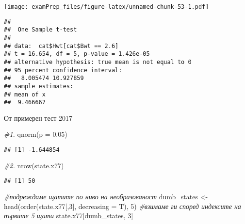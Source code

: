 \documentclass[
]{article}
\newenvironment{Shaded}{\begin{snugshade}}{\end{snugshade}}
\newcommand{\AttributeTok}[1]{\textcolor[rgb]{0.77,0.63,0.00}{#1}}
\newcommand{\CommentTok}[1]{\textcolor[rgb]{0.56,0.35,0.01}{\textit{#1}}}
\newcommand{\DecValTok}[1]{\textcolor[rgb]{0.00,0.00,0.81}{#1}}
\newcommand{\FloatTok}[1]{\textcolor[rgb]{0.00,0.00,0.81}{#1}}
\newcommand{\FunctionTok}[1]{\textcolor[rgb]{0.00,0.00,0.00}{#1}}
\newcommand{\NormalTok}[1]{#1}
\newcommand{\OtherTok}[1]{\textcolor[rgb]{0.56,0.35,0.01}{#1}}
\newcommand{\SpecialCharTok}[1]{\textcolor[rgb]{0.00,0.00,0.00}{#1}}
\begin{document}
\texttt{[image: examPrep\_files/figure-latex/unnamed-chunk-53-1.pdf]}

\begin{Shaded}
\end{Shaded}

\begin{verbatim}
## 
##  One Sample t-test
## 
## data:  cat$Hwt[cat$Bwt == 2.6]
## t = 16.654, df = 5, p-value = 1.426e-05
## alternative hypothesis: true mean is not equal to 0
## 95 percent confidence interval:
##   8.005474 10.927859
## sample estimates:
## mean of x 
##  9.466667
\end{verbatim}

От примерен тест 2017

\begin{Shaded}
\begin{Highlighting}[]
\CommentTok{\#1.}
\FunctionTok{qnorm}\NormalTok{(}\AttributeTok{p =} \FloatTok{0.05}\NormalTok{)}
\end{Highlighting}
\end{Shaded}

\begin{verbatim}
## [1] -1.644854
\end{verbatim}

\begin{Shaded}
\begin{Highlighting}[]
\CommentTok{\#2.}
\FunctionTok{nrow}\NormalTok{(state.x77)}
\end{Highlighting}
\end{Shaded}

\begin{verbatim}
## [1] 50
\end{verbatim}

\begin{Shaded}
\begin{Highlighting}[]
\CommentTok{\#подреждаме щатите по ниво на необразованост}
\NormalTok{dumb\_states }\OtherTok{\textless{}{-}} \FunctionTok{head}\NormalTok{(}\FunctionTok{order}\NormalTok{(state.x77[,}\DecValTok{3}\NormalTok{], }\AttributeTok{decreasing =}\NormalTok{ T), }\DecValTok{5}\NormalTok{)}
\CommentTok{\#взимаме ги според индексите на първите 5 щата}
\NormalTok{state.x77[dumb\_states, }\DecValTok{3}\NormalTok{]}
\end{Highlighting}
\end{Shaded}
\end{document}
